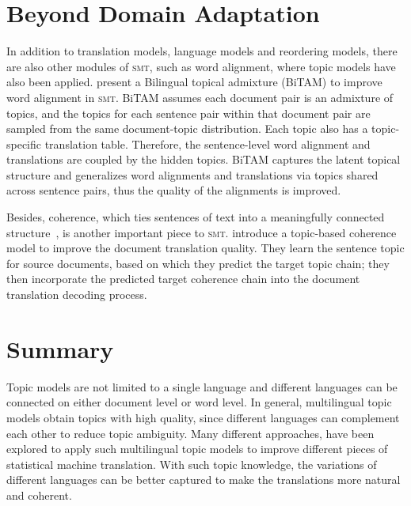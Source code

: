 \section{Beyond Domain Adaptation}

In addition to translation models, language models and reordering models,
there are also other modules of \textsc{smt}, such as word alignment,
where topic models have also been applied. \citet{zhao-06} present a
Bilingual topical admixture (BiTAM) to improve  word
alignment in \textsc{smt}. BiTAM assumes each document pair is an
admixture of topics, and the topics for each sentence pair within that
document pair are sampled from the same document-topic
distribution. Each topic also has a topic-specific translation
table. Therefore, the sentence-level word alignment and translations
are coupled by the hidden topics.  BiTAM captures the latent
topical structure and generalizes word alignments and translations via
topics shared across sentence pairs, thus the quality of the
alignments is improved.

Besides, coherence, which ties sentences of text into a meaningfully
connected structure~\citep{xiong-13}, is another important piece to
\textsc{smt}. \citet{xiong-13} introduce a topic-based coherence model
to improve the document translation quality. They learn the sentence
topic for source documents, based on which they predict the target
topic chain; they then incorporate the predicted target coherence
chain into the document translation decoding process.

\section{Summary}

Topic models are not limited to a single language and different languages
can be connected on either document level or word level.
In general, multilingual topic models obtain topics with high quality,
since different languages can complement each other to reduce topic
ambiguity. Many different approaches, have been explored to apply such
multilingual topic models to improve different pieces of statistical
machine translation. With such topic knowledge, the variations of
different languages can be better captured to make the translations
more natural and coherent.
